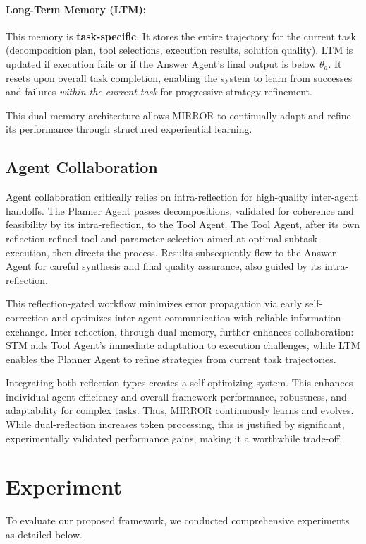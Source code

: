 \documentclass{article}
\begin{document}
\paragraph{Long-Term Memory (LTM):} This memory is \textbf{task-specific}. It stores the entire trajectory for the current task (decomposition plan, tool selections, execution results, solution quality). LTM is updated if execution fails or if the Answer Agent's final output is below $\theta_a$. It resets upon overall task completion, enabling the system to learn from successes and failures \textit{within the current task} for progressive strategy refinement.

This dual-memory architecture allows MIRROR to continually adapt and refine its performance through structured experiential learning.




\subsection{Agent Collaboration}
Agent collaboration critically relies on intra-reflection for high-quality inter-agent handoffs. The Planner Agent passes decompositions, validated for coherence and feasibility by its intra-reflection, to the Tool Agent. The Tool Agent, after its own reflection-refined tool and parameter selection aimed at optimal subtask execution, then directs the process. Results subsequently flow to the Answer Agent for careful synthesis and final quality assurance, also guided by its intra-reflection.

This reflection-gated workflow minimizes error propagation via early self-correction and optimizes inter-agent communication with reliable information exchange. Inter-reflection, through dual memory, further enhances collaboration: STM aids Tool Agent's immediate adaptation to execution challenges, while LTM enables the Planner Agent to refine strategies from current task trajectories.

Integrating both reflection types creates a self-optimizing system. This enhances individual agent efficiency and overall framework performance, robustness, and adaptability for complex tasks. Thus, MIRROR continuously learns and evolves. While dual-reflection increases token processing, this is justified by significant, experimentally validated performance gains, making it a worthwhile trade-off.


\section{Experiment}
To evaluate our proposed framework, we conducted comprehensive experiments as detailed below.
\end{document}
